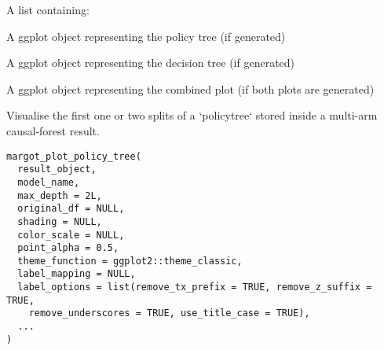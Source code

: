 \documentclass[a4paper]{book}
\begin{document}
%
\begin{Value}
A list containing:
\begin{ldescription}
\item[\code{policy\_tree}] A ggplot object representing the policy tree (if generated)
\item[\code{decision\_tree}] A ggplot object representing the decision tree (if generated)
\item[\code{combined\_plot}] A ggplot object representing the combined plot (if both plots are generated)
\end{ldescription}
\end{Value}
%
\begin{Description}
Visualise the first one or two splits of a `policytree` stored inside a
multi-arm causal-forest result.
\end{Description}
%
\begin{Usage}
\begin{verbatim}
margot_plot_policy_tree(
  result_object,
  model_name,
  max_depth = 2L,
  original_df = NULL,
  shading = NULL,
  color_scale = NULL,
  point_alpha = 0.5,
  theme_function = ggplot2::theme_classic,
  label_mapping = NULL,
  label_options = list(remove_tx_prefix = TRUE, remove_z_suffix = TRUE,
    remove_underscores = TRUE, use_title_case = TRUE),
  ...
)
\end{verbatim}
\end{Usage}
%
\end{document}
